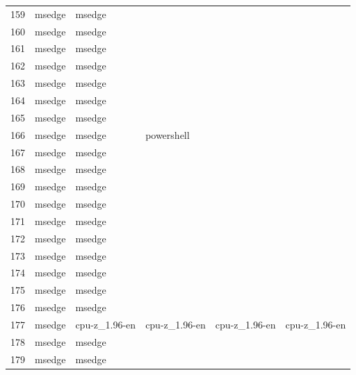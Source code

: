 \documentclass[a4paper,twoside,12pt]{book}
\begin{document}
\begin{appendices}
\begin{table}
\begin{tabular}{l|l|l|l|l|l}
		159 &  msedge &         msedge &                &                &                \\
		160 &  msedge &         msedge &                &                &                \\
		161 &  msedge &         msedge &                &                &                \\
		162 &  msedge &         msedge &                &                &                \\
		163 &  msedge &         msedge &                &                &                \\
		164 &  msedge &         msedge &                &                &                \\
		165 &  msedge &         msedge &                &                &                \\
		166 &  msedge &         msedge &     powershell &                &                \\
		167 &  msedge &         msedge &                &                &                \\
		168 &  msedge &         msedge &                &                &                \\
		169 &  msedge &         msedge &                &                &                \\
		170 &  msedge &         msedge &                &                &                \\
		171 &  msedge &         msedge &                &                &                \\
		172 &  msedge &         msedge &                &                &                \\
		173 &  msedge &         msedge &                &                &                \\
		174 &  msedge &         msedge &                &                &                \\
		175 &  msedge &         msedge &                &                &                \\
		176 &  msedge &         msedge &                &                &                \\
		177 &  msedge &  cpu-z\_1.96-en &  cpu-z\_1.96-en &  cpu-z\_1.96-en &  cpu-z\_1.96-en \\
		178 &  msedge &         msedge &                &                &                \\
		179 &  msedge &         msedge &                &                &                \\

\end{tabular}
\end{table}
\end{appendices}
\end{document}
